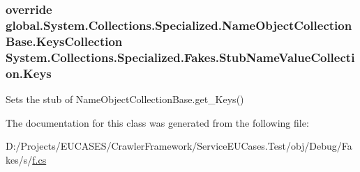 \hypertarget{class_system_1_1_collections_1_1_specialized_1_1_fakes_1_1_stub_name_value_collection_ab6db6e7983b5df701e20f2aaa54cacb4}{
\subsubsection[{Keys}]{\setlength{\rightskip}{0pt plus 5cm}override global.\-System.\-Collections.\-Specialized.\-Name\-Object\-Collection\-Base.\-Keys\-Collection System.\-Collections.\-Specialized.\-Fakes.\-Stub\-Name\-Value\-Collection.\-Keys\hspace{0.3cm}{\ttfamily [get]}}}\label{class_system_1_1_collections_1_1_specialized_1_1_fakes_1_1_stub_name_value_collection_ab6db6e7983b5df701e20f2aaa54cacb4}


Sets the stub of Name\-Object\-Collection\-Base.\-get\-\_\-\-Keys()



The documentation for this class was generated from the following file\-:\begin{DoxyCompactItemize}
\item 
D\-:/\-Projects/\-E\-U\-C\-A\-S\-E\-S/\-Crawler\-Framework/\-Service\-E\-U\-Cases.\-Test/obj/\-Debug/\-Fakes/s/\hyperlink{s_2f_8cs}{f.\-cs}\end{DoxyCompactItemize}
